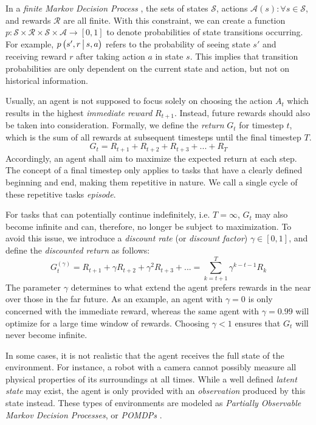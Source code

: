In a \textit{finite Markov Decision Process} \cite{bible}, the sets of states $\mathscr{S}$, actions $\mathscr{A}(s) : \forall s \in \mathscr{S}$, and rewards $\mathscr{R}$ are all finite. With this constraint, we can create a function $p : \mathscr{S} \times \mathscr{R} \times \mathscr{S} \times \mathscr{A} \to \left[0, 1\right]$ to denote probabilities of state transitions occurring. For example, $p\left(s', r \,\middle|\, s, a\right)$ refers to the probability of seeing state $s'$ and receiving reward $r$ after taking action $a$ in state $s$. This implies that transition probabilities are only dependent on the current state and action, but not on historical information.

Usually, an agent is not supposed to focus solely on choosing the action $A_t$ which results in the highest \textit{immediate reward} $R_{t+1}$. Instead, future rewards should also be taken into consideration. Formally, we define the \textit{return} $G_t$ for timestep $t$, which is the sum of all rewards at subsequent timesteps until the final timestep $T$.
\begin{equation*}
    G_t = R_{t+1} + R_{t+2} + R_{t+3} + ... + R_T
\end{equation*}
Accordingly, an agent shall aim to maximize the expected return at each step. The concept of a final timestep only applies to tasks that have a clearly defined beginning and end, making them repetitive in nature. We call a single cycle of these repetitive tasks \textit{episode}.

For tasks that can potentially continue indefinitely, i.e. $T = \infty$, $G_t$ may also become infinite and can, therefore, no longer be subject to maximization. To avoid this issue, we introduce a \textit{discount rate} (or \textit{discount factor}) $\gamma \in [0, 1]$, and define the \textit{discounted return} as follows:
\begin{equation*}
    G_t^{(\gamma)} = R_{t+1} + \gamma R_{t+2} + \gamma^2 R_{t+3} + ...
        = \sum_{k=t+1}^T \gamma^{k-t-1} R_k
\end{equation*}
The parameter $\gamma$ determines to what extend the agent prefers rewards in the near over those in the far future. As an example, an agent with $\gamma = 0$ is only concerned with the immediate reward, whereas the same agent with $\gamma = 0.99$ will optimize for a large time window of rewards. Choosing $\gamma < 1$ ensures that $G_t$ will never become infinite.

In some cases, it is not realistic that the agent receives the full state of the environment. For instance, a robot with a camera cannot possibly measure all physical properties of its surroundings at all times. While a well defined \textit{latent state} may exist, the agent is only provided with an \textit{observation} produced by this state instead. These types of environments are modeled as \textit{Partially Observable Markov Decision Processes}, or \textit{POMDPs} \cite{bible}.